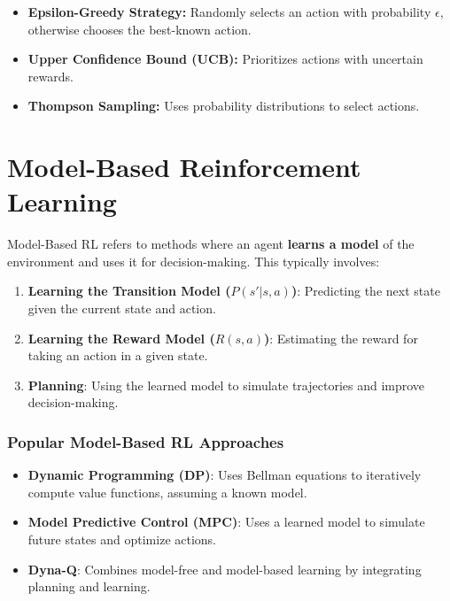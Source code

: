 \documentclass[
]{book}
\providecommand{\tightlist}{%
  \setlength{\itemsep}{0pt}\setlength{\parskip}{0pt}}
\begin{document}
\begin{itemize}
\tightlist
\item
  \textbf{Epsilon-Greedy Strategy:} Randomly selects an action with probability \(\epsilon\), otherwise chooses the best-known action.
\item
  \textbf{Upper Confidence Bound (UCB):} Prioritizes actions with uncertain rewards.
\item
  \textbf{Thompson Sampling:} Uses probability distributions to select actions.
\end{itemize}

\chapter{\texorpdfstring{\textbf{Model-Based Reinforcement Learning}}{Model-Based Reinforcement Learning}}\label{model-based-reinforcement-learning}

Model-Based RL refers to methods where an agent \textbf{learns a model} of the environment and uses it for decision-making. This typically involves:

\begin{enumerate}
\def\labelenumi{\arabic{enumi}.}
\tightlist
\item
  \textbf{Learning the Transition Model (\(P(s' | s, a)\))}: Predicting the next state given the current state and action.
\item
  \textbf{Learning the Reward Model (\(R(s, a)\))}: Estimating the reward for taking an action in a given state.
\item
  \textbf{Planning}: Using the learned model to simulate trajectories and improve decision-making.
\end{enumerate}

\subsection{\texorpdfstring{\textbf{Popular Model-Based RL Approaches}}{Popular Model-Based RL Approaches}}\label{popular-model-based-rl-approaches}

\begin{itemize}
\tightlist
\item
  \textbf{Dynamic Programming (DP)}: Uses Bellman equations to iteratively compute value functions, assuming a known model.
\item
  \textbf{Model Predictive Control (MPC)}: Uses a learned model to simulate future states and optimize actions.
\item
  \textbf{Dyna-Q}: Combines model-free and model-based learning by integrating planning and learning.
\end{itemize}
\end{document}
